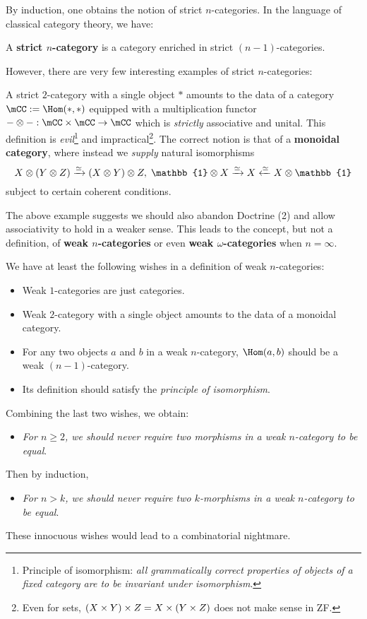 \medskip
By induction, one obtains the notion of strict $n$-categories. In the language of classical category theory, we have:

\begin{defn}
	A \textbf{strict $n$-category} is a category enriched in strict $(n-1)$-categories.
\end{defn}

\ssec{}

However, there are very few interesting examples of strict $n$-categories:

\begin{exam}
	A strict $2$-category with a single object $*$ amounts to the data of a category $\mCC:=\Hom(*,*)$ equipped with a multiplication functor $-\ot-:\mCC\mt \mCC \to \mCC$ which is \emph{strictly} associative and unital. This definition is \emph{evil}\footnote{Principle of isomorphism: \emph{all grammatically correct properties of objects of a fixed category are to be invariant under isomorphism}.} and impractical\footnote{Even for sets, $(X\mt Y)\mt Z=X \mt(Y\mt Z)$ does not make sense in ZF.}. The correct notion is that of a \textbf{monoidal category}, where instead we \emph{supply} natural isomorphisms
	\[
		X\ot (Y\ot Z) \xrightarrow{\simeq} (X\ot Y) \ot Z,\;  \mathbb{1} \ot X \xrightarrow{\simeq} X \xleftarrow{\simeq} X \ot \mathbb{1}
	\]
	subject to certain coherent conditions.
\end{exam}

\ssec{}

The above example suggests we should also abandon Doctrine (2) and allow associativity to hold in a weaker sense. This leads to the concept, but not a definition, of \textbf{weak $n$-categories} or even \textbf{weak $\omega$-categories} when $n=\infty$.

\medskip

We have at least the following wishes in a definition of weak $n$-categories:
\begin{itemize}
	\item
		Weak $1$-categories are just categories.
	\item
		Weak $2$-category with a single object amounts to the data of a monoidal category.
	\item
		For any two objects $a$ and $b$ in a weak $n$-category, $\Hom(a,b)$ should be a weak $(n-1)$-category.
	\item
		Its definition should satisfy the \emph{principle of isomorphism}. 
\end{itemize}
Combining the last two wishes, we obtain:
\begin{itemize}
	\item[]
		\emph{For $n\ge 2$, we should never require two morphisms in a weak $n$-category to be equal}.
\end{itemize}
Then by induction,
\begin{itemize}
	\item[]
		\emph{For $n> k$, we should never require two $k$-morphisms in a weak $n$-category to be equal}.
\end{itemize}
These innocuous wishes would lead to a combinatorial nightmare.

